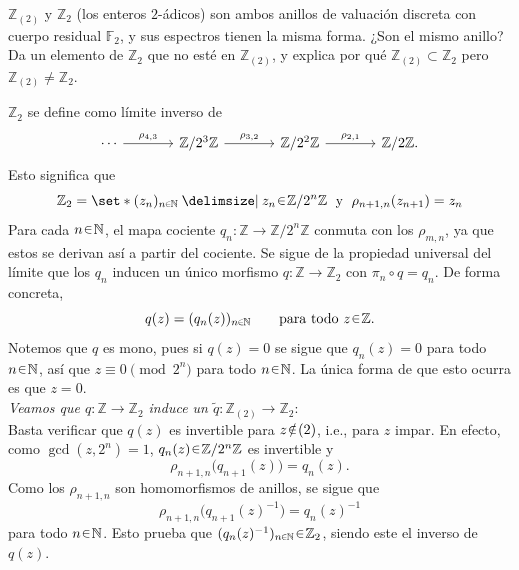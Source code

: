 \begin{ejer}
$\mathbb{Z}_{(2)}$ y $\mathbb{Z}_2$ (los enteros $2$-ádicos) son ambos anillos de valuación discreta con cuerpo residual $\mathbb{F}_2$, y sus espectros tienen la misma forma. ¿Son el mismo anillo? Da un elemento de $\mathbb{Z}_2$ que no esté en $\mathbb{Z}_{(2)}$, y explica por qué $\mathbb{Z}_{(2)}\subset\mathbb{Z}_2$ pero $\mathbb{Z}_{(2)}\neq\mathbb{Z}_2$.
\end{ejer}
\begin{sol}
$\mathbb{Z}_2$ se define como límite inverso de
\[
\begin{tikzcd}[column sep=large]
\cdots \arrow[r,"\rho_{4,3}"]
    & \mathbb{Z}/2^3\mathbb{Z} \arrow[r,"\rho_{3,2}"]
    & \mathbb{Z}/2^2\mathbb{Z} \arrow[r,"\rho_{2,1}"]
    & \mathbb{Z}/2\mathbb{Z}.
\end{tikzcd}
\]
Esto significa que
\[
\mathbb{Z}_2=\set*{(z_n)_{n\en\mathbb{N}}\given
z_n\en\mathbb{Z}/2^n\mathbb{Z}\;\text{ y }\;\rho_{n+1,n}(z_{n+1})=z_n}
\]
Para cada $n\en\mathbb{N}$, el mapa cociente $q_n\colon\mathbb{Z}\to\mathbb{Z}/2^n\mathbb{Z}$ conmuta con los $\rho_{m,n}$, ya que estos se derivan así a partir del cociente. Se sigue de la propiedad universal del límite que los $q_n$ inducen un único morfismo $q\colon\mathbb{Z}\to\mathbb{Z}_2$ con $\pi_n\circ q=q_n$. De forma concreta,
\[
q(z)=(q_n(z))_{n\en\mathbb{N}}
\qquad\text{para todo }z\en\mathbb{Z}.
\]
Notemos que $q$ es mono, pues si $q(z)=0$ se sigue que $q_n(z)=0$ para todo $n\en\mathbb{N}$, así que $z\equiv0\pmod{2^n}$ para todo $n\en\mathbb{N}$. La única forma de que esto ocurra es que $z=0$.
\vspace{1em}\\
\emph{Veamos que $q\colon\mathbb{Z}\to\mathbb{Z}_2$ induce un
$\widetilde q\colon\mathbb{Z}_{(2)}\to\mathbb{Z}_2$}:\\ 
Basta verificar que
$q(z)$ es invertible para $z\noten(2)$, i.e., para $z$ impar. En efecto,
como $\gcd(z,2^n)=1$, $q_n(z)\en\mathbb{Z}/2^n\mathbb{Z}$ es invertible y
\[
\rho_{n+1,n}\bigl(q_{n+1}(z)\bigr)=q_n(z).
\]
Como los $\rho_{n+1,n}$ son homomorfismos de anillos, se sigue que
\[
\rho_{n+1,n}\bigl(q_{n+1}(z)^{-1}\bigr)=q_n(z)^{-1}
\]
para todo $n\en\mathbb{N}$. Esto prueba que
$(q_n(z)^{-1})_{n\en\mathbb{N}}\en\mathbb{Z}_2$, siendo este el inverso de
$q(z)$.


\end{sol}
